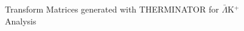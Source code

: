 \documentclass[../AnalysisNoteJBuxton.tex]{subfiles}
\begin{document}
\begin{figure}[h!]
  \caption[Transform Matrices for $\bar{\Lambda}$K$^{+}$ Analysis]{Transform Matrices generated with THERMINATOR for $\bar{\Lambda}$K$^{+}$ Analysis}
  \label{fig:TransformMatricesALamKchP}
\end{figure}
\end{document}
